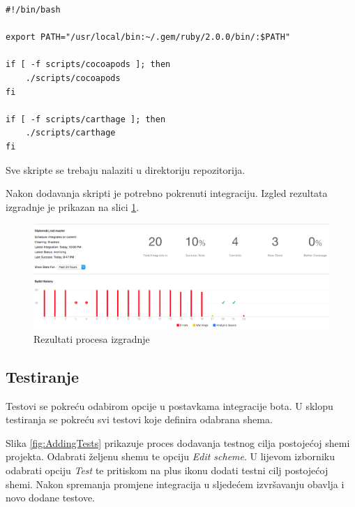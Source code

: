 \documentclass[times, utf8, diplomski, numeric]{fer}
\begin{document}
\begin{appendices}
\begin{lstlisting}[caption=Skripta koja se izvršava prije integracije, label=listing:pre_integration_script]
#!/bin/bash

export PATH="/usr/local/bin:~/.gem/ruby/2.0.0/bin/:$PATH"

if [ -f scripts/cocoapods ]; then
    ./scripts/cocoapods
fi

if [ -f scripts/carthage ]; then
    ./scripts/carthage
fi
\end{lstlisting}

Sve skripte se trebaju nalaziti u  direktoriju repozitorija.

Nakon dodavanja skripti je potrebno pokrenuti integraciju. Izgled rezultata izgradnje je prikazan na slici \ref{fig:XcodeServerBuildResult}.

\begin{figure}
\centering
\includegraphics[scale=0.3]{XcodeServerBuildResult}
\caption{Rezultati procesa izgradnje}
\label{fig:XcodeServerBuildResult}
\end{figure}

\subsection{Testiranje}

Testovi se pokreću odabirom opcije  u postavkama integracije bota. U sklopu testiranja se pokreću svi testovi koje definira odabrana shema.

Slika \ref{fig:AddingTests} prikazuje proces dodavanja testnog cilja postojećoj shemi projekta. Odabrati željenu shemu te opciju \textit{Edit scheme}. U lijevom izborniku odabrati opciju \textit{Test} te pritiskom na plus ikonu dodati testni cilj postojećoj shemi. Nakon spremanja promjene integracija u sljedećem izvršavanju obavlja i novo dodane testove.


\end{appendices}
\end{document}
